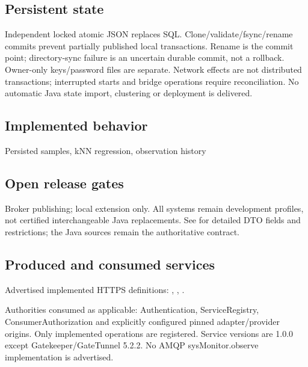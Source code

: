 \documentclass[a4paper]{arrowhead}
\begin{document}
\subsection{Persistent state}
Independent locked atomic JSON replaces SQL. Clone/validate/fsync/rename commits prevent partially published local transactions. Rename is the commit point; directory-sync failure is an uncertain durable commit, not a rollback. Owner-only keys/password files are separate. Network effects are not distributed transactions; interrupted starts and bridge operations require reconciliation. No automatic Java state import, clustering or deployment is delivered.
\subsection{Implemented behavior}
Persisted samples, kNN regression, observation history
\subsection{Open release gates}
Broker publishing; local extension only. All systems remain development profiles, not certified interchangeable Java replacements. See  for detailed DTO fields and restrictions; the Java sources remain the authoritative contract.
\subsection{Produced and consumed services}
Advertised implemented HTTPS definitions: , \allowbreak {}, \allowbreak {}.\par
Authorities consumed as applicable: Authentication, ServiceRegistry, ConsumerAuthorization and explicitly configured pinned adapter/provider origins. Only implemented operations are registered. Service versions are 1.0.0 except Gatekeeper/GateTunnel 5.2.2. No AMQP sysMonitor.observe implementation is advertised.
\clearpage
\end{document}
